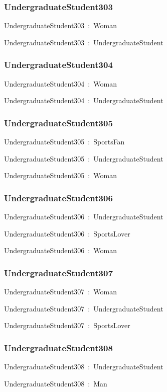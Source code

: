 \documentclass{article}
\begin{document}
\subsubsection*{UndergraduateStudent303}

UndergraduateStudent303~:~Woman

UndergraduateStudent303~:~UndergraduateStudent

\subsubsection*{UndergraduateStudent304}

UndergraduateStudent304~:~Woman

UndergraduateStudent304~:~UndergraduateStudent

\subsubsection*{UndergraduateStudent305}

UndergraduateStudent305~:~SportsFan

UndergraduateStudent305~:~UndergraduateStudent

UndergraduateStudent305~:~Woman

\subsubsection*{UndergraduateStudent306}

UndergraduateStudent306~:~UndergraduateStudent

UndergraduateStudent306~:~SportsLover

UndergraduateStudent306~:~Woman

\subsubsection*{UndergraduateStudent307}

UndergraduateStudent307~:~Woman

UndergraduateStudent307~:~UndergraduateStudent

UndergraduateStudent307~:~SportsLover

\subsubsection*{UndergraduateStudent308}

UndergraduateStudent308~:~UndergraduateStudent

UndergraduateStudent308~:~Man
\end{document}
